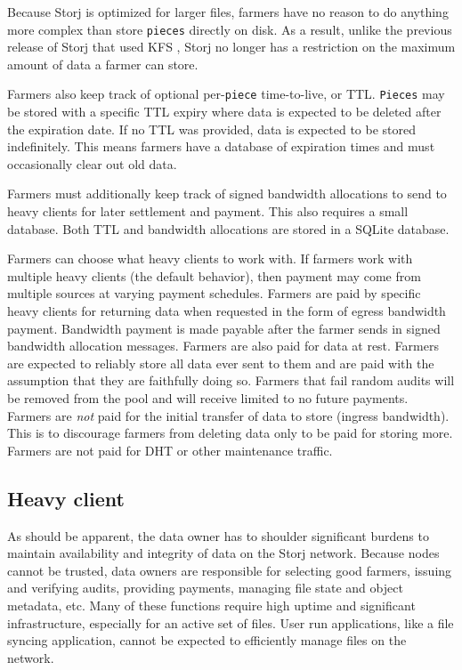 \documentclass[a4paper,10pt]{article} \usepackage[utf8]{inputenc}
\newcommand{\x}[1]{{\tt #1}} \newcommand{\code}[1]{{\tt #1}}
\begin{document}
Because Storj is optimized for larger files, farmers have no reason to do
anything more complex than store \x{pieces} directly on disk. As a result,
unlike the previous release of Storj that used KFS \cite{storj-v2}, Storj no
longer has a restriction on the maximum amount of data a farmer can store.

Farmers also keep track of optional per-\x{piece} time-to-live, or TTL.
\x{Pieces} may be stored with a specific TTL expiry where data is expected to
be deleted after the expiration date. If no TTL was provided, data is expected
to be stored indefinitely. This means farmers have a database of expiration
times and must occasionally clear out old data.

Farmers must additionally keep track of signed bandwidth allocations to send to
heavy clients for later settlement and payment. This also requires a small
database. Both TTL and bandwidth allocations are stored in a SQLite
\cite{sqlite} database.

Farmers can choose what heavy clients to work with. If farmers work with
multiple heavy clients (the default behavior), then payment may come from
multiple sources at varying payment schedules.
Farmers are paid by specific heavy clients for returning data when requested in
the form of egress bandwidth payment. Bandwidth payment is made payable after
the farmer sends in signed bandwidth allocation messages.
Farmers are also paid for data at rest.
Farmers are expected to reliably store all data ever sent to them and are paid
with the assumption that they are faithfully doing so.
Farmers that fail random audits will be removed from the pool and will receive
limited to no future payments.
Farmers are {\em not} paid for the initial transfer of data to store (ingress
bandwidth). This is to discourage farmers from deleting data only to be paid for
storing more. Farmers are not paid for DHT or other maintenance traffic.

\subsection{Heavy client}

As should be apparent, the data owner has to shoulder significant burdens
to maintain availability and integrity of data on the Storj network. Because
nodes cannot be trusted, data owners are responsible for selecting good
farmers, issuing and verifying audits, providing payments, managing file state
and object metadata, etc. Many of these functions require high uptime and
significant infrastructure, especially for an active set of files. User run
applications, like a file syncing application, cannot be expected to efficiently
manage files on the network.
\end{document}
